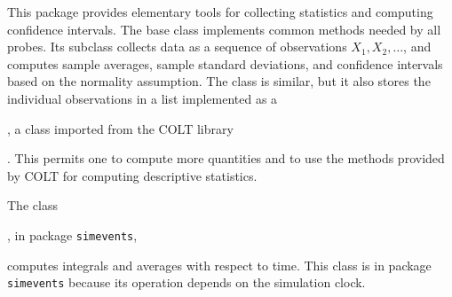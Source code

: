 
This package provides elementary tools for collecting statistics and computing
confidence intervals.  The base class 
implements common methods needed by all probes.  
Its subclass 
collects data as a sequence of observations $X_1,X_2,\dots$, and computes
sample averages, sample standard deviations, and confidence intervals
based on the normality assumption. 
The class  is 
similar, but it also stores the individual observations in a list 
implemented as a %
\begin{latexonly}, a class imported from the COLT library\end{latexonly}.
This permits one to compute more quantities and to use the methods 
provided by COLT for computing descriptive statistics.

The class %
\begin{latexonly}, in package \texttt{simevents},\end{latexonly}
computes integrals and averages with respect to time.
This class is in package \texttt{simevents} because its operation depends
on the simulation clock.

\iffalse  %
The class
\externalclass{umontreal.iro.lecuyer.stat}{FunctionOfMultipleMeansTally}
collects data as a sequence of $d$-dimensional
vectors $\boldX_1, \boldX_2, \ldots$,
and computes a function of sample averages with a sample variance, and
a confidence interval on the corresponding function of means using the
delta theorem.
The function of averages to consider, as well as its gradient, need to
be computed by an implementation of
\externalclass{umontreal.iro.lecuyer.util}{MultivariateFunction},
for example,
\externalclass{umontreal.iro.lecuyer.util}{RatioFunction} for
a ratio of two quantities.
\fi  %


